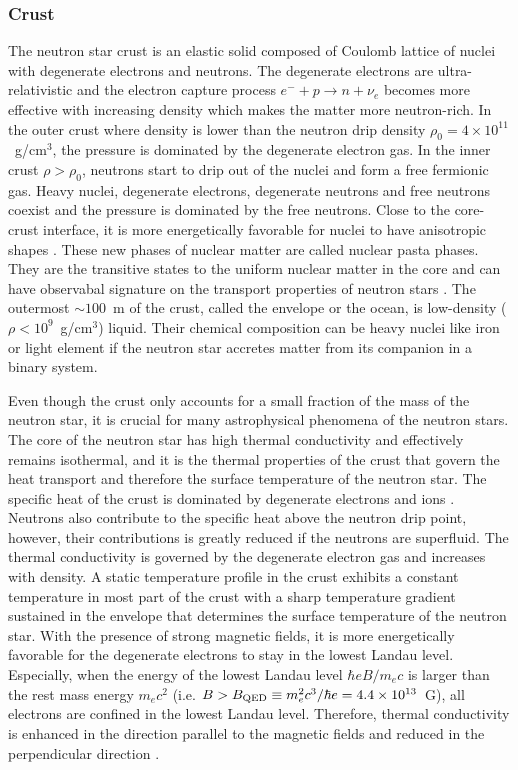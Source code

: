 \subsubsection{Crust}

The neutron star crust is an elastic solid composed of Coulomb lattice of nuclei with degenerate electrons and neutrons.
The degenerate electrons are ultra-relativistic and the electron capture process $e^-+p\rightarrow n + \nu_e$ becomes more effective with increasing density which makes the matter more neutron-rich.
In the outer crust where density is lower than the neutron drip density $\rho_0=4\times 10^{11}$~g/cm$^3$, the pressure is dominated by the degenerate electron gas.
In the inner crust $\rho>\rho_0$,  neutrons start to drip out of the nuclei and form a free fermionic gas. Heavy nuclei, degenerate electrons, degenerate neutrons and free neutrons coexist and the pressure is dominated by the free neutrons.
Close to the core-crust interface, it is more energetically favorable for nuclei to have anisotropic shapes \citep{1983NuPhA.407..571R}. 
These new phases of nuclear matter are called nuclear pasta phases. They are the transitive states to the uniform nuclear matter in the core and can have observabal signature on the transport properties of neutron stars  \citep{2017RvMP...89d1002C}. 
The outermost $\sim 100$~m of the crust, called the envelope or the ocean, is low-density ($\rho<10^9$~g/cm$^3$) liquid.
Their chemical composition can be heavy nuclei like iron or light element if the neutron star accretes matter from its companion in a binary system.

Even though the crust only accounts for a small fraction of the mass of the neutron star, it is crucial for many astrophysical phenomena of the neutron stars.
The core of the neutron star has high thermal conductivity and effectively remains isothermal, and it is the thermal properties of the crust that govern the heat transport and therefore the surface temperature of the neutron star.
The specific heat of the crust is dominated by degenerate electrons and ions \citep{2015SSRv..191..239P}. Neutrons also contribute to the specific heat above the neutron drip point, however, their contributions is greatly reduced if the neutrons are superfluid.
The thermal conductivity is governed by the degenerate electron gas and increases with density.
 A static temperature profile in the crust exhibits a constant temperature in most part of the crust with a sharp temperature gradient sustained in the envelope that determines the surface temperature of the neutron star.   
With the presence of strong magnetic fields, it is more energetically favorable for the degenerate electrons to stay in the lowest Landau level. 
Especially, when the energy of the lowest Landau level $\hbar e B/m_e c$ is larger than the rest mass energy $m_e c^2$ (i.e. $B>B_{\rm QED}\equiv m_e^2 c^3/\hbar e=4.4\times 10^{13}$~G), all electrons are confined in the lowest Landau level.
Therefore, thermal conductivity is enhanced in the direction parallel to the magnetic fields and reduced in the perpendicular direction \citep{1996A&A...306..999P,1996A&A...314..341P}.


